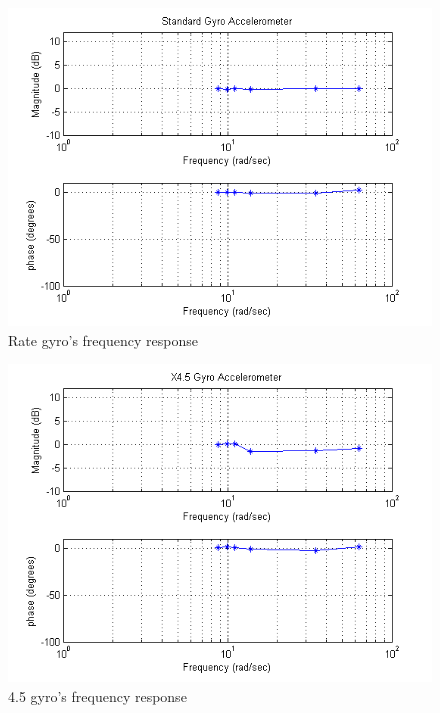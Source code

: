 \documentclass{article}
\theoremstyle{plain}
\theoremstyle{definition}
\theoremstyle{remark}
\begin{document}
\begin{figure}[hbt]
\begin{center}
\includegraphics[width = 14cm]{GyroBode.png}
\caption{Rate gyro's frequency response}
\label{gyroBode}
\end{center}
\end{figure}

\begin{figure}[hbt]
\begin{center}
\includegraphics[width = 14cm]{Gyro45Bode.png}
\caption{4.5 gyro's frequency response}
\label{gyro45Bode}
\end{center}
\end{figure}
\end{document}
